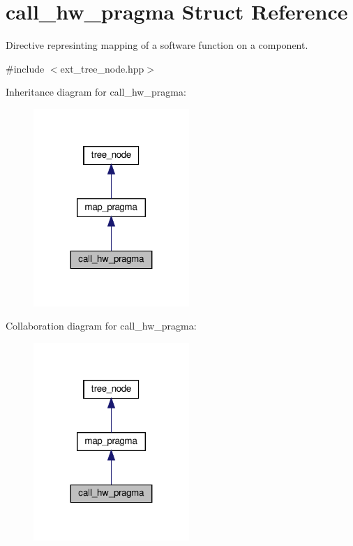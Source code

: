 \hypertarget{structcall__hw__pragma}{}\section{call\+\_\+hw\+\_\+pragma Struct Reference}
\label{structcall__hw__pragma}


Directive represinting mapping of a software function on a component.  




{\ttfamily \#include $<$ext\+\_\+tree\+\_\+node.\+hpp$>$}



Inheritance diagram for call\+\_\+hw\+\_\+pragma\+:
\nopagebreak
\begin{figure}[H]
\begin{center}
\leavevmode
\includegraphics[width=167pt]{dd/d92/structcall__hw__pragma__inherit__graph}
\end{center}
\end{figure}


Collaboration diagram for call\+\_\+hw\+\_\+pragma\+:
\nopagebreak
\begin{figure}[H]
\begin{center}
\leavevmode
\includegraphics[width=167pt]{db/dcb/structcall__hw__pragma__coll__graph}
\end{center}
\end{figure}
